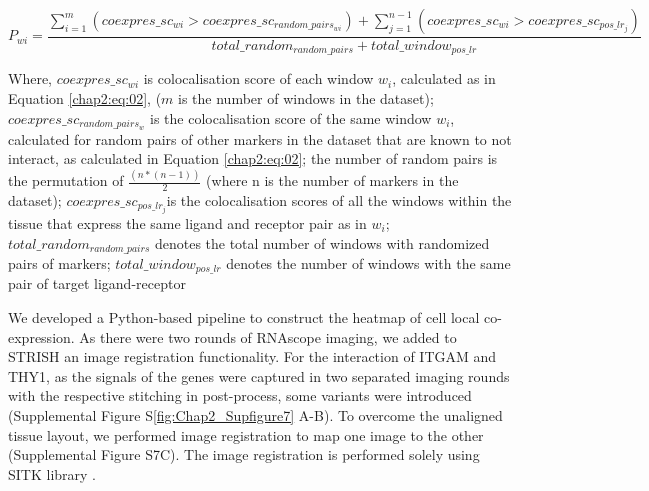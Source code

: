 \begin{equation}
    P_{wi} = \frac{\sum_{i=1}^{m}(coexpres\_sc_{wi} > coexpres\_sc_{random\_pairs_{wi}})+ \sum_{j=1}^{n-1}(coexpres\_sc_{wi} > coexpres\_sc_{pos\_lr_j}) }{total\_random_{random\_pairs} + total\_window_{pos\_lr}}
    \label{chap2:eq:03}
\end{equation}

Where,	$coexpres\_sc_{wi}$  is colocalisation score of each window $w_i$, calculated as in Equation \ref{chap2:eq:02}, ($m$ is the number of windows in the dataset); $coexpres\_sc_{random\_pairs_w}$ is the colocalisation score of the same window $w_i$, calculated for random pairs of other markers in the dataset that are known to not interact, as calculated in Equation \ref{chap2:eq:02}; the number of random pairs is the permutation of $\frac{(n*(n-1))}{2}$ (where n is the number of markers in the dataset); $coexpres
\_sc_{pos\_lr_j}$is the colocalisation scores of all the windows within the tissue that express the same ligand and receptor pair as in $w_i$; $total\_random_{random\_pairs}$ denotes the total number of windows with randomized pairs of markers; $total\_window_{pos\_lr}$  denotes the number of windows with the same pair of target ligand-receptor

We developed a Python-based pipeline to construct the heatmap of cell local co-expression. 
As there were two rounds of RNAscope imaging, we added to STRISH an image registration functionality. For the interaction of ITGAM and THY1, as the signals of the genes were captured in two separated imaging rounds with the respective stitching in post-process, some variants were introduced (Supplemental Figure S\ref{fig:Chap2_Supfigure7} A-B). To overcome the unaligned tissue layout, we performed image registration to map one image to the other (Supplemental Figure S7C). The image registration is performed solely using SITK library \cite{lowekamp2013design, yaniv2018simpleitk}.  

